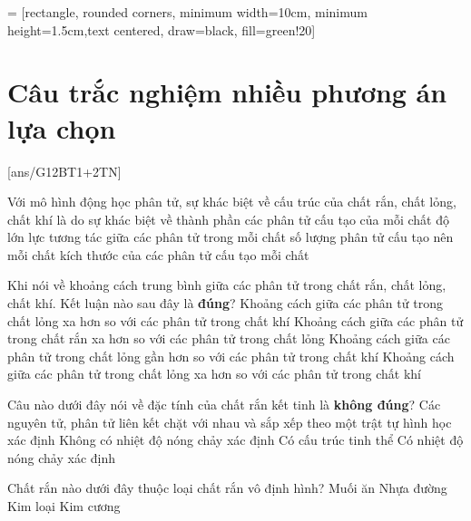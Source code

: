  = [rectangle, rounded corners, minimum width=10cm, minimum height=1.5cm,text centered, draw=black, fill=green!20]
\begin{center}
\end{center}
\setcounter{section}{0}
\section{Câu trắc nghiệm nhiều phương án lựa chọn}
[ans/G12BT1+2TN]
\begin{ex}
	Với mô hình động học phân tử, sự khác biệt về cấu trúc của chất rắn, chất lỏng, chất khí là do sự khác biệt về
	\choice
	{thành phần các phân tử cấu tạo của mỗi chất}
	{\True độ lớn lực tương tác giữa các phân tử trong mỗi chất}
	{số lượng phân tử cấu tạo nên mỗi chất}
	{kích thước của các phân tử cấu tạo mỗi chất}
	\loigiai{}
\end{ex}
\begin{ex}
Khi nói về khoảng cách trung bình giữa các phân tử trong chất rắn, chất lỏng, chất khí. Kết luận nào sau đây là \textbf{đúng}?	
	\choice
	{Khoảng cách giữa các phân tử trong chất lỏng xa hơn so với các phân tử trong chất khí}
	{Khoảng cách giữa các phân tử trong chất rắn xa hơn so với các phân tử trong chất lỏng}
	{\True Khoảng cách giữa các phân tử trong chất lỏng gần hơn so với các phân tử trong chất khí}
	{Khoảng cách giữa các phân tử trong chất lỏng xa hơn so với các phân tử trong chất khí}
	\loigiai{}
\end{ex}
\begin{ex}
	Câu nào dưới đây nói về đặc tính của chất rắn kết tinh là \textbf{không đúng}?
	\choice
	{Các nguyên tử, phân tử liên kết chặt với nhau và sắp xếp theo một trật tự hình học xác định}
	{\True Không có nhiệt độ nóng chảy xác định}
	{Có cấu trúc tinh thể}
	{Có nhiệt độ nóng chảy xác định}
	\loigiai{}
\end{ex}
\begin{ex}
	Chất rắn nào dưới đây thuộc loại chất rắn vô định hình?
	\choice
	{Muối ăn}
	{Nhựa đường}
	{Kim loại}
	{Kim cương}
	\loigiai{}
\end{ex}

